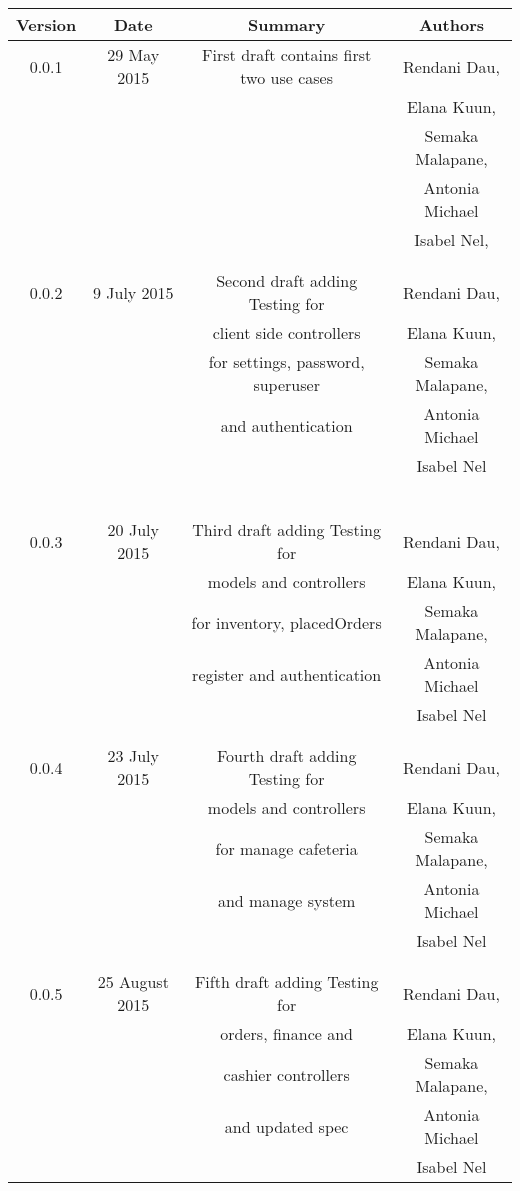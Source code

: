 \documentclass[a4paper,12pt]{article}
\begin{document}
\begin{table}[h!]
\centering
 \begin{tabular}{||c c c c||} 
 \hline
 \textbf{Version} & \textbf{Date} & \textbf{Summary} & \textbf{Authors} \\ [0.5ex] 
 \hline\hline
 0.0.1 & 29 May 2015 &  First draft contains first two use cases  & Rendani Dau, \\ & & & Elana Kuun, \\ & & & Semaka Malapane, \\ & & & Antonia Michael \\ & & & Isabel Nel, \\ & & & \\
 \hline 
 & & & \\
 0.0.2 & 9 July 2015 &  Second draft adding Testing for  & Rendani Dau, \\ & & client side controllers & Elana Kuun, \\ & & for settings, password, superuser & Semaka Malapane, \\ & & and authentication &  Antonia Michael \\ & & & Isabel Nel \\   [1ex] 
\ & & & \\
 \hline 
 & & & \\
 0.0.3 & 20 July 2015 &  Third draft adding Testing for  & Rendani Dau, \\ & & models and controllers & Elana Kuun, \\ & & for inventory, placedOrders & Semaka Malapane, \\ & & register and authentication &  Antonia Michael \\ & & & Isabel Nel \\   [1ex] 
 & & & \\
 \hline 
 & & & \\
 0.0.4 & 23 July 2015 &  Fourth draft adding Testing for  & Rendani Dau, \\ & & models and controllers & Elana Kuun, \\ & & for manage cafeteria & Semaka Malapane, \\ & & and manage system &  Antonia Michael \\ & & & Isabel Nel \\   [1ex] 
& & & \\
 \hline 
 & & & \\
 0.0.5 & 25 August 2015 &  Fifth draft adding Testing for  & Rendani Dau, \\ & & orders, finance and & Elana Kuun, \\ & & cashier controllers& Semaka Malapane, \\ & & and updated spec &  Antonia Michael \\ & & & Isabel Nel \\   [1ex] 

\end{tabular}
\end{table}
\end{document}
